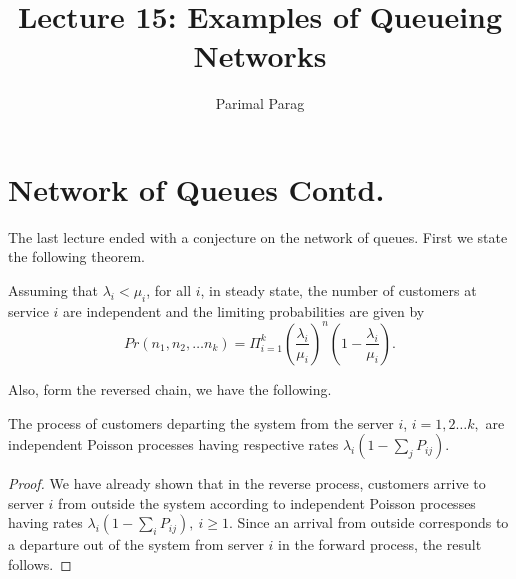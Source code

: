 \documentclass[a4paper,10pt]{article}
\title{Lecture 15: Examples of Queueing Networks}
\author{Parimal Parag}
\begin{document}
\maketitle
\section{Network of Queues Contd.}
The last lecture ended with a conjecture on the network of queues. First we state the following theorem.
\begin{thm}
Assuming that $\lambda_i < \mu_i$, for all $i$, in steady state, the number of customers at service $i$ are independent and the limiting probabilities are given by
\begin{equation*}
Pr(n_1,n_2, \hdots n_k) = \Pi_{i=1}^{k}{(\frac{\lambda_i}{\mu_i})}^n (1-\frac{\lambda_i}{\mu_i}).
\end{equation*}
\end{thm}
Also, form the reversed chain, we have the following.
\begin{cor}
The process of customers departing the system from the server $i$, $i=1,2 \hdots k,$ are independent Poisson processes having respective rates $\lambda_i (1-\sum_j P_{ij} )$.
\end{cor}
\begin{proof}
We have already shown that in the reverse process, customers arrive to server $i$ from outside the system according to independent Poisson processes having rates $\lambda_i(1-\sum_{i}P_{ij}),~ i \geq 1$. Since an arrival from outside corresponds to a departure out of the system from server $i$ in the forward process, the result follows. 
\end{proof}
\end{document}
